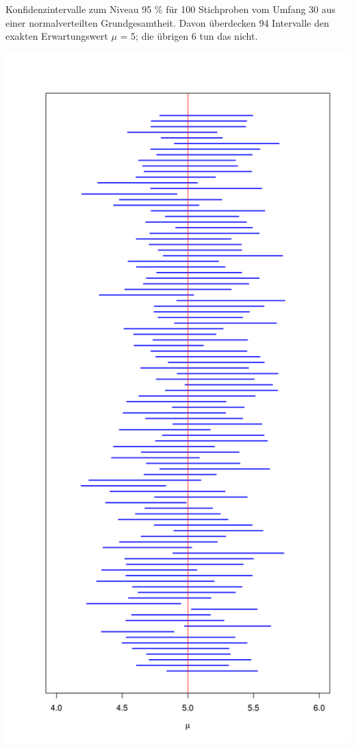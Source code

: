 \documentclass{article}
\begin{document}
\begin{multicols*}{3}
    \begin{figure1}
      \caption{Konfidenzintervalle zum Niveau 95 $\%$ für 100 Stichproben vom Umfang 30
      aus einer normalverteilten Grundgesamtheit. Davon überdecken
      94 Intervalle den exakten Erwartungswert $\mu$ = 5; die übrigen 6 tun das nicht.}
      \centering
      \includegraphics[scale=0.12, angle=90]{coni}
    \end{figure1}


\end{multicols*}
\end{document}

